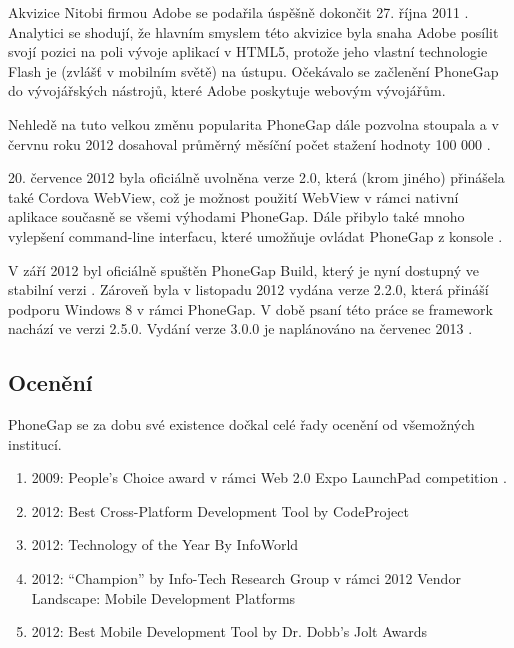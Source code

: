 Akvizice Nitobi firmou Adobe se podařila úspěšně dokončit 27. října 2011 \cite{nitobi_adobe2}. Analytici se shodují, že hlavním smyslem této akvizice byla snaha Adobe posílit svojí pozici na poli vývoje aplikací v HTML5, protože jeho vlastní technologie Flash je (zvlášť v mobilním světě) na ústupu. Očekávalo se začlenění PhoneGap do vývojářských nástrojů, které Adobe poskytuje webovým vývojářům.

Nehledě na tuto velkou změnu popularita PhoneGap dále pozvolna stoupala a v červnu roku 2012 dosahoval průměrný měsíční počet stažení hodnoty 100 000 \cite{phonegap_myths}.

20. července 2012 byla oficiálně uvolněna verze 2.0, která (krom jiného) přinášela také Cordova WebView, což je možnost použití WebView v rámci nativní aplikace současně se všemi výhodami PhoneGap. Dále přibylo také mnoho vylepšení command-line interfacu, které umožňuje ovládat PhoneGap z konsole \cite{phonegap_2_released}. 

V září 2012 byl oficiálně spuštěn PhoneGap Build, který je nyní dostupný ve stabilní verzi \cite{phonegap_build_launched}. Zároveň byla v listopadu 2012 vydána verze 2.2.0, která přináší podporu Windows 8 v rámci PhoneGap. V době psaní této práce se framework nachází ve verzi 2.5.0. Vydání verze 3.0.0 je naplánováno na červenec 2013 \cite{cordova_roadmapprojects}. 

\subsection{Ocenění}
PhoneGap se za dobu své existence dočkal celé řady ocenění od všemožných institucí.

\begin{enumerate}
	\item 2009: People’s Choice award v rámci Web 2.0 Expo LaunchPad competition \cite{phonegap_winning_webexpo}. 
	\item 2012: Best Cross-Platform Development Tool by CodeProject \cite{phonegap_best_xplatfrom_tool}
	\item 2012: Technology of the Year By InfoWorld \cite{infoworld_technology_of_2012}
	\item 2012: “Champion” by Info-Tech Research Group v rámci 2012 Vendor Landscape: Mobile Development Platforms \cite{phonegap_champion}
	\item 2012: Best Mobile Development Tool by Dr. Dobb's Jolt Awards \cite{phonegap_best_mobile_dev_tool}
\end{enumerate}

